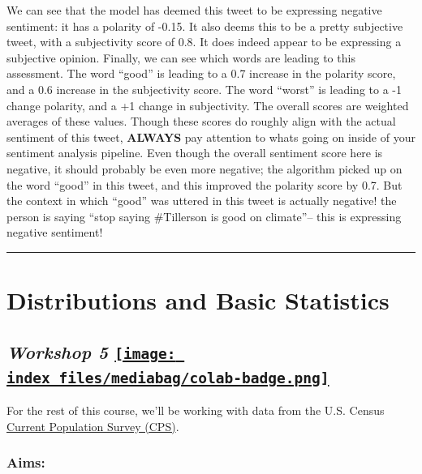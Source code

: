 \documentclass[
  letterpaper,
  DIV=11,
  numbers=noendperiod]{scrreprt}
\begin{document}
We can see that the model has deemed this tweet to be expressing
negative sentiment: it has a polarity of -0.15. It also deems this to be
a pretty subjective tweet, with a subjectivity score of 0.8. It does
indeed appear to be expressing a subjective opinion. Finally, we can see
which words are leading to this assessment. The word ``good'' is leading
to a 0.7 increase in the polarity score, and a 0.6 increase in the
subjectivity score. The word ``worst'' is leading to a -1 change
polarity, and a +1 change in subjectivity. The overall scores are
weighted averages of these values. Though these scores do roughly align
with the actual sentiment of this tweet, \textbf{ALWAYS} pay attention
to whats going on inside of your sentiment analysis pipeline. Even
though the overall sentiment score here is negative, it should probably
be even more negative; the algorithm picked up on the word ``good'' in
this tweet, and this improved the polarity score by 0.7. But the context
in which ``good'' was uttered in this tweet is actually negative! the
person is saying ``stop saying \#Tillerson is good on climate''-- this
is expressing negative sentiment!

\begin{center}\rule{0.5\linewidth}{0.5pt}\end{center}


\hypertarget{distributions-and-basic-statistics}{%
\chapter{Distributions and Basic
Statistics}\label{distributions-and-basic-statistics}}

\hypertarget{workshop-5-open-in-colab}{%
\section[\emph{Workshop 5} ]{\texorpdfstring{\emph{Workshop 5}
\href{https://colab.research.google.com/github/oballinger/QM2/blob/main/notebooks/W05.\%20Distributions\%20and\%20Basic\%20Statistics.ipynb}{\protect\texttt{[image: index\_files/mediabag/colab-badge.png]}}}{Workshop 5 Open In Colab}}\label{workshop-5-open-in-colab}}

For the rest of this course, we'll be working with data from the U.S.
Census \href{https://www.census.gov/programs-surveys/cps.html}{Current
Population Survey (CPS)}.

\hypertarget{aims-2}{%
\subsection{Aims:}\label{aims-2}}
\end{document}
